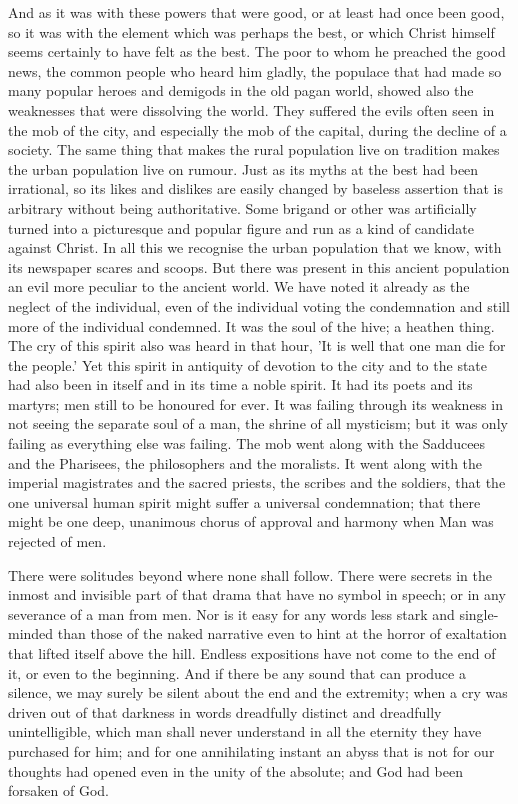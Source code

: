 And as it was with these powers that were good, or at least had once been good, so it was with the element which was perhaps the best, or which Christ himself seems certainly to have felt as the best. The poor to whom he preached the good news, the common people who heard him gladly, the populace that had made so many popular heroes and demigods in the old pagan world, showed also the weaknesses that were dissolving the world. They suffered the evils often seen in the mob of the city, and especially the mob of the capital, during the decline of a society. The same thing that makes the rural population live on tradition makes the urban population live on rumour. Just as its myths at the best had been irrational, so its likes and dislikes are easily changed by baseless assertion that is arbitrary without being authoritative. Some brigand or other was artificially turned into a picturesque and popular figure and run as a kind of candidate against Christ. In all this we recognise the urban population that we know, with its newspaper scares and scoops. But there was present in this ancient population an evil more peculiar to the ancient world. We have noted it already as the neglect of the individual, even of the individual voting the condemnation and still more of the individual condemned. It was the soul of the hive; a heathen thing. The cry of this spirit also was heard in that hour, 'It is well that one man die for the people.' Yet this spirit in antiquity of devotion to the city and to the state had also been in itself and in its time a noble spirit. It had its poets and its martyrs; men still to be honoured for ever. It was failing through its weakness in not seeing the separate soul of a man, the shrine of all mysticism; but it was only failing as everything else was failing. The mob went along with the Sadducees and the Pharisees, the philosophers and the moralists. It went along with the imperial magistrates and the sacred priests, the scribes and the soldiers, that the one universal human spirit might suffer a universal condemnation; that there might be one deep, unanimous chorus of approval and harmony when Man was rejected of men.

There were solitudes beyond where none shall follow. There were secrets in the inmost and invisible part of that drama that have no symbol in speech; or in any severance of a man from men. Nor is it easy for any words less stark and single-minded than those of the naked narrative even to hint at the horror of exaltation that lifted itself above the hill. Endless expositions have not come to the end of it, or even to the beginning. And if there be any sound that can produce a silence, we may surely be silent about the end and the extremity; when a cry was driven out of that darkness in words dreadfully distinct and dreadfully unintelligible, which man shall never understand in all the eternity they have purchased for him; and for one annihilating instant an abyss that is not for our thoughts had opened even in the unity of the absolute; and God had been forsaken of God.

